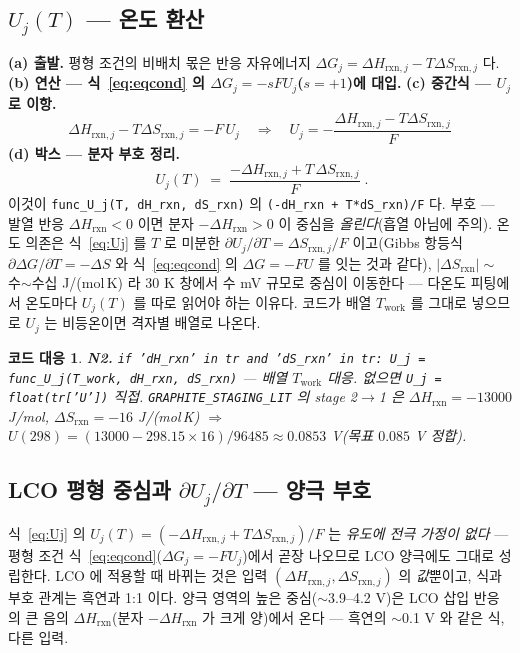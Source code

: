 \documentclass[11pt,a4paper]{article}
\newtheorem*{codebox}{코드 대응}
\newcommand{\rxn}{\mathrm{rxn}}
\newcommand{\work}{\mathrm{work}}
\newcommand{\code}[1]{\texttt{#1}}
\begin{document}
\subsection{$U_j(T)$ — 온도 환산}
\textbf{(a) 출발.} 평형 조건의 비배치 몫은 반응 자유에너지 $\Delta G_j=\Delta H_{\rxn,j}-T\Delta S_{\rxn,j}$ 다.
\textbf{(b) 연산 — 식~\eqref{eq:eqcond} 의 $\Delta G_j=-sFU_j$($s=+1$)에 대입.} \textbf{(c) 중간식 — $U_j$ 로 이항.}
\begin{equation}
\Delta H_{\rxn,j}-T\Delta S_{\rxn,j}=-F\,U_j
\quad\Longrightarrow\quad
U_j=-\frac{\Delta H_{\rxn,j}-T\Delta S_{\rxn,j}}{F}
\label{eq:Ujmid}
\end{equation}
\textbf{(d) 박스 — 분자 부호 정리.}
\begin{equation}
\boxed{\;U_j(T)\;=\;\frac{-\Delta H_{\rxn,j}+T\,\Delta S_{\rxn,j}}{F}\;.}
\label{eq:Uj}
\end{equation}
이것이 \code{func\_U\_j(T, dH\_rxn, dS\_rxn)} 의 \code{(-dH\_rxn + T*dS\_rxn)/F} 다. 부호 — 발열 반응
$\Delta H_\rxn<0$ 이면 분자 $-\Delta H_\rxn>0$ 이 중심을 \emph{올린다}(흡열 아님에 주의). 온도 의존은 식~\eqref{eq:Uj} 를
$T$ 로 미분한 $\partial U_j/\partial T=\Delta S_{\rxn,j}/F$ 이고(Gibbs 항등식 $\partial\Delta G/\partial T=-\Delta S$ 와
식~\eqref{eq:eqcond} 의 $\Delta G=-FU$ 를 잇는 것과 같다), $|\Delta S_\rxn|\sim$ 수$\sim$수십 J/(mol\,K) 라 $30$ K
창에서 수 mV 규모로 중심이 이동한다 — 다온도 피팅에서 온도마다 $U_j(T)$ 를 따로 읽어야 하는 이유다. 코드가 배열
$T_\work$ 를 그대로 넣으므로 $U_j$ 는 비등온이면 격자별 배열로 나온다.

\begin{codebox}
\textbf{N2.} \code{if 'dH\_rxn' in tr and 'dS\_rxn' in tr: U\_j = func\_U\_j(T\_work, dH\_rxn, dS\_rxn)}
— 배열 $T_\work$ 대응. 없으면 \code{U\_j = float(tr['U'])} 직접. \code{GRAPHITE\_STAGING\_LIT} 의 stage 2$\to$1 은
$\Delta H_\rxn=-13000$ J/mol, $\Delta S_\rxn=-16$ J/(mol\,K) $\Rightarrow$ $U(298)=(13000-298.15\times16)/96485
\approx0.0853$ V(목표 $0.085$ V 정합).
\end{codebox}

\subsection{LCO 평형 중심과 $\partial U_j/\partial T$ — 양극 부호}\label{sec:lco-center}
식~\eqref{eq:Uj} 의 $U_j(T)=(-\Delta H_{\rxn,j}+T\Delta S_{\rxn,j})/F$ 는 \emph{유도에 전극 가정이 없다} — 평형 조건
식~\eqref{eq:eqcond}($\Delta G_j=-FU_j$)에서 곧장 나오므로 LCO 양극에도 그대로 성립한다. LCO 에 적용할 때 바뀌는 것은
입력 $(\Delta H_{\rxn,j},\Delta S_{\rxn,j})$ 의 \emph{값}뿐이고, 식과 부호 관계는 흑연과 1:1 이다. 양극 영역의 높은
중심($\sim$3.9--4.2 V)은 LCO 삽입 반응의 큰 음의 $\Delta H_\rxn$(분자 $-\Delta H_\rxn$ 가 크게 양)에서 온다 — 흑연의
$\sim$0.1 V 와 같은 식, 다른 입력.
\end{document}
